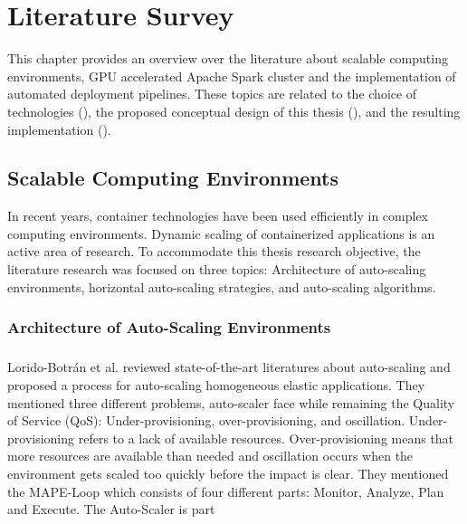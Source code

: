 \chapter{Literature Survey}
\label{chap:03_related-work}


This chapter provides an overview over the literature about scalable computing environments, GPU accelerated Apache Spark cluster and the implementation of automated deployment pipelines. These topics are related to the choice of technologies (), the proposed conceptual design of this thesis (), and the resulting implementation ().


\section{Scalable Computing Environments}
In recent years, container technologies have been used efficiently in complex computing environments. Dynamic scaling of containerized applications is an active area of research.
To accommodate this thesis research objective, the literature research was focused on three topics: Architecture of auto-scaling environments, horizontal auto-scaling strategies, and auto-scaling algorithms.


\subsection{Architecture of Auto-Scaling Environments}
\paragraph{}
Lorido-Botrán et al.  reviewed state-of-the-art literatures about auto-scaling and proposed a process for auto-scaling homogeneous elastic applications. They mentioned three different problems, auto-scaler face while remaining the Quality of Service (QoS): Under-provisioning, over-provisioning, and oscillation. Under-provisioning refers to a lack of available resources. Over-provisioning means that more resources are available than needed and oscillation occurs when the environment gets scaled too quickly before the impact is clear. They mentioned the MAPE-Loop which consists of four different parts: Monitor, Analyze, Plan and Execute.  The Auto-Scaler is part 


